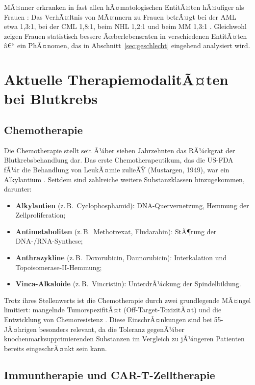 ﻿\documentclass[12pt,a4paper]{article}
\theoremstyle{definition}
\begin{document}
MÃ¤nner erkranken in fast allen hÃ¤matologischen EntitÃ¤ten hÃ¤ufiger als Frauen
\cite{cook2009}: Das VerhÃ¤ltnis von MÃ¤nnern zu Frauen betrÃ¤gt bei der AML etwa 1,3:1,
bei der CML 1,8:1, beim NHL 1,2:1 und beim MM 1,3:1 \cite{siegel2023}. Gleichwohl
zeigen Frauen statistisch bessere Ãœberlebensraten in verschiedenen EntitÃ¤ten
\cite{micheli2009} â€“ ein PhÃ¤nomen, das in Abschnitt~\ref{sec:geschlecht} eingehend
analysiert wird.

\section{Aktuelle TherapiemodalitÃ¤ten bei Blutkrebs}
\label{sec:therapie}

\subsection{Chemotherapie}

Die Chemotherapie stellt seit Ã¼ber sieben Jahrzehnten das RÃ¼ckgrat der
Blutkrebsbehandlung dar. Das erste Chemotherapeutikum, das die US-FDA fÃ¼r die
Behandlung von LeukÃ¤mie zulieÃŸ (Mustargen, 1949), war ein Alkylantium
\cite{adeyemi2025}. Seitdem sind zahlreiche weitere Substanzklassen hinzugekommen,
darunter:
\begin{itemize}
  \item \textbf{Alkylantien} (z.\,B.\ Cyclophosphamid): DNA-Quervernetzung,
        Hemmung der Zellproliferation;
  \item \textbf{Antimetaboliten} (z.\,B.\ Methotrexat, Fludarabin):
        StÃ¶rung der DNA-/RNA-Synthese;
  \item \textbf{Anthrazykline} (z.\,B.\ Doxorubicin, Daunorubicin):
        Interkalation und Topoisomerase-II-Hemmung;
  \item \textbf{Vinca-Alkaloide} (z.\,B.\ Vincristin): UnterdrÃ¼ckung
        der Spindelbildung.
\end{itemize}

Trotz ihres Stellenwerts ist die Chemotherapie durch zwei grundlegende MÃ¤ngel
limitiert: mangelnde TumorspezifitÃ¤t (Off-Target-ToxizitÃ¤t) und die Entwicklung von
Chemoresistenz \cite{adeyemi2025,mccabe2015}. Diese EinschrÃ¤nkungen sind bei
55-JÃ¤hrigen besonders relevant, da die Toleranz gegenÃ¼ber knochenmarksupprimierenden
Substanzen im Vergleich zu jÃ¼ngeren Patienten bereits eingeschrÃ¤nkt sein kann.

\subsection{Immuntherapie und CAR-T-Zelltherapie}
\end{document}
